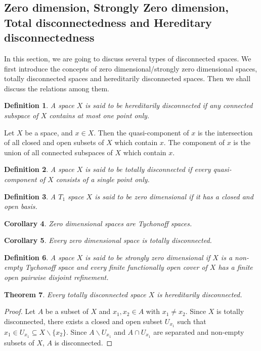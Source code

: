 \documentclass[12pt,oneside,english]{amsbook}
\numberwithin{equation}{section} %
\numberwithin{figure}{section} %
\theoremstyle{plain}
\numberwithin{section}{chapter}
\newtheorem{thm}{Theorem}[section]
\theoremstyle{plain}
\newtheorem{corollary}[thm]{Corollary}
\newtheorem{defn}[thm]{Definition}
\begin{document}
\subsection{Zero dimension, Strongly Zero dimension, Total disconnectedness and Hereditary disconnectedness}

In this section, we are going to discuss several types of disconnected spaces. We first introduce the concepts of zero dimensional/strongly zero dimensional spaces, totally disconnected spaces and hereditarily disconnected spaces. Then we shall discuss the relations among them.

\begin{defn}\label{connectedness:12}
  A space $X$ is said to be hereditarily disconnected if any connected subspace of $X$ contains at most one point only.
\end{defn}

Let $X$ be a space, and $x \in X$. Then the quasi-component of $x$ is the intersection of all closed and open subsets of $X$ which contain $x$. The component of $x$ is the union of all connected subspaces of $X$ which contain $x$.

\begin{defn}\label{connectedness:13}
  A space $X$ is said to be totally disconnected if every quasi-component of $X$ consists of a single point only.
\end{defn}

\begin{defn}\label{connectedness:14}
  A $T_{1}$ space $X$ is said to be zero dimensional if it has a closed and open basis.
\end{defn}

\begin{corollary}\label{connectedness:15}
  Zero dimensional spaces are Tychonoff spaces.
\end{corollary}

\begin{corollary}\label{connectedness:26}
  Every zero dimensional space is totally disconnected.
\end{corollary}

\begin{defn}\label{connectedness:16}
  A space $X$ is said to be strongly zero dimensional if $X$ is a non-empty Tychonoff space and every finite functionally open cover of $X$ has a finite open pairwise disjoint refinement.
\end{defn}

\begin{thm}\label{connectedness:17}
  Every totally disconnected space $X$ is hereditarily disconnected.
\end{thm}
\begin{proof}
  Let $A$ be a subset of $X$ and $x_1,x_2 \in A$ with $x_1 \neq x_2$. Since $X$ is totally disconnected, there exists a closed and open subset $U_{x_1}$ such that $x_1 \in U_{x_1} \subseteq X \backslash \{x_2\}$. Since $A \backslash U_{x_1}$ and $A \cap U_{x_1}$ are separated and non-empty subsets of $X$, $A$ is disconnected.
\end{proof}
\end{document}
